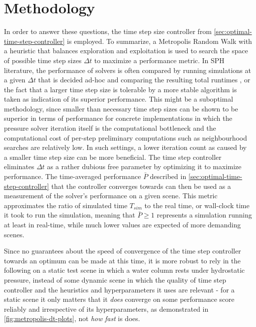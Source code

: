 \documentclass[oneside, a4paper]{book}
\begin{document}
  \section{Methodology}
  In order to answer these questions, the time step size controller from \autoref{sec:optimal-time-step-controller} is employed. To summarize, a Metropolis Random Walk with a heuristic that balances exploration and exploitation is used to search the space of possible time step sizes $\Delta t$ to maximize a performance metric. In SPH literature, the performance of solvers is often compared by running simulations at a given $\Delta t$ that is decided ad-hoc and comparing the resulting total runtimes \autocites{iisph}{dfsph}{pcisph}, or the fact that a larger time step size is tolerable by a more stable algorithm is taken as indication of its superior performance. This might be a suboptimal methodology, since smaller than necessary time step sizes can be shown to be superior in terms of performance for concrete implementations in which the pressure solver iteration itself is the computational bottleneck and the computational cost of per-step preliminary computations such as neighbourhood searches are relatively low. In such settings, a lower iteration count as caused by a smaller time step size can be more beneficial. The time step controller eliminates $\Delta t$ as a rather dubious free parameter by optimizing it to maximize performance. The time-averaged performance $\bar{P}$ described in \autoref{sec:optimal-time-step-controller} that the controller converges towards can then be used as a measurement of the solver's performance on a given scene. This metric approximates the ratio of simulated time $T_{sim}$ to the real time, or wall-clock time it took to run the simulation, meaning that $\bar{P}\geq1$ represents a simulation running at least in real-time, while much lower values are expected of more demanding scenes. 
  
  Since no guarantees about the speed of convergence of the time step controller towards an optimum can be made at this time, it is more robust to rely in the following on a static test scene in which a water column rests under hydrostatic pressure, instead of some dynamic scene in which the quality of time step controller and the heuristics and hyperparameters it uses are relevant - for a static scene it only matters that it \textit{does} converge on some performance score reliably and irrespective of its hyperparameters, as demonstrated in \autoref{fig:metropolis-dt-plots}, not \textit{how fast} is does. 
\end{document}

